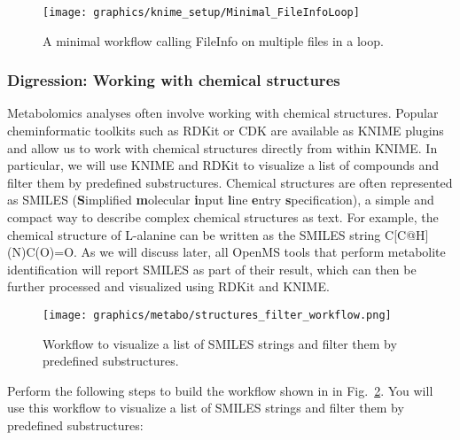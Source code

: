 \begin{figure}
\centering
\texttt{[image: graphics/knime\_setup/Minimal\_FileInfoLoop]}
\caption{A minimal workflow calling FileInfo on multiple files in a loop.}
\label{fig:knime_minimal_loop}
\end{figure}

\subsubsection{Digression: Working with chemical structures}
Metabolomics analyses often involve working with chemical structures. Popular cheminformatic toolkits such as RDKit or CDK are available as KNIME plugins and allow us to work with chemical structures directly from within KNIME. In particular, we will use KNIME and RDKit to visualize a list of compounds and filter them by predefined substructures. Chemical structures are often represented as SMILES (\textbf{S}implified \textbf{m}olecular \textbf{i}nput \textbf{l}ine \textbf{e}ntry \textbf{s}pecification), a simple and compact way to describe complex chemical structures as text. For example, the chemical structure of L-alanine can be written as the SMILES string C[C@H](N)C(O)=O. As we will discuss later, all OpenMS tools that perform metabolite identification will report SMILES as part of their result, which can then be further processed and visualized using RDKit and KNIME.

\begin{figure}
\centering
\texttt{[image: graphics/metabo/structures\_filter\_workflow.png]}
\caption{Workflow to visualize a list of SMILES strings and filter them by predefined substructures.}
\label{fig:structures_filter_workflow}
\end{figure}

\noindent Perform the following steps to build the workflow shown in in Fig.~\ref{fig:structures_filter_workflow}. You will use this workflow to visualize a list of SMILES strings and filter them by predefined substructures:

